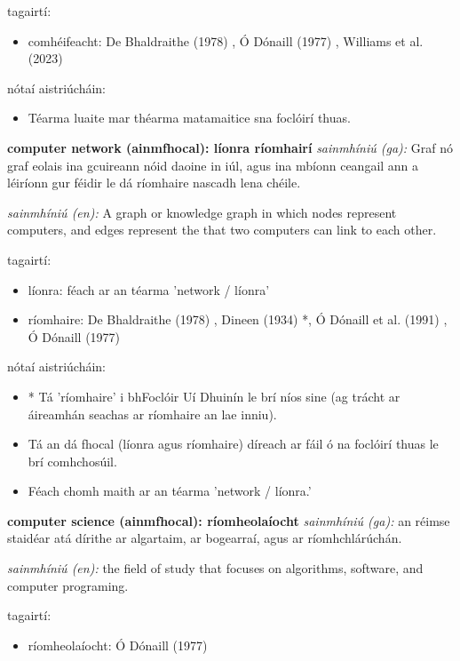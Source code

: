 \documentclass{article}
\begin{document}
tagairtí:
\begin{itemize}
	\item comhéifeacht: De Bhaldraithe (1978) \cite{de-bhaldraithe}, Ó Dónaill (1977) \cite{odonaill}, Williams et al. (2023) \cite{storchiste}
\end{itemize}

nótaí aistriúcháin:
\begin{itemize}
	\item Téarma luaite mar théarma matamaitice sna foclóirí thuas.
\end{itemize}


\textbf{computer network (ainmfhocal): líonra ríomhairí}
\textit{sainmhíniú (ga):} Graf nó graf eolais ina gcuireann nóid daoine in iúl, agus ina mbíonn ceangail ann a léiríonn gur féidir le dá ríomhaire nascadh lena chéile.

\textit{sainmhíniú (en):} A graph or knowledge graph in which nodes represent computers, and edges represent the that two computers can link to each other.

tagairtí:
\begin{itemize}
	\item líonra: féach ar an téarma 'network / líonra'
	\item ríomhaire: De Bhaldraithe (1978) \cite{de-bhaldraithe}, Dineen (1934) \cite{dineen}*, Ó Dónaill et al. (1991) \cite{focloir-beag}, Ó Dónaill (1977) \cite{odonaill}
\end{itemize}

nótaí aistriúcháin:
\begin{itemize}
	\item * Tá 'ríomhaire' i bhFoclóir Uí Dhuinín le brí níos sine (ag trácht ar áireamhán seachas ar ríomhaire an lae inniu).
	\item Tá an dá fhocal (líonra agus ríomhaire) díreach ar fáil ó na foclóirí thuas le brí comhchosúil.
	\item Féach chomh maith ar an téarma 'network / líonra.'
\end{itemize}


\textbf{computer science (ainmfhocal): ríomheolaíocht}
\textit{sainmhíniú (ga):} an réimse staidéar atá dírithe ar algartaim, ar bogearraí, agus ar ríomhchlárúchán.

\textit{sainmhíniú (en):} the field of study that focuses on algorithms, software, and computer programing.

tagairtí:
\begin{itemize}
	\item ríomheolaíocht: Ó Dónaill (1977) \cite{odonaill}
\end{itemize}
\end{document}
